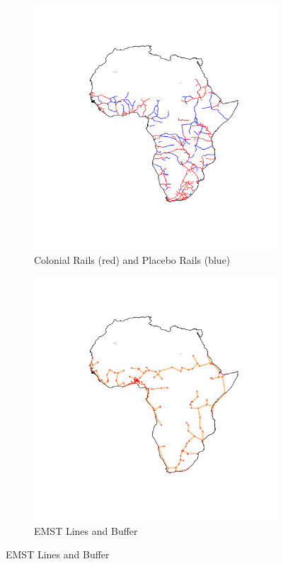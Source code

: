 \documentclass[11pt, oneside]{article}   	%
\begin{document}
\begin{figure}
\centering
\caption{Colonial Railway Network}

\begin{subfigure}[c]{0.48\textwidth}
\includegraphics[width=\textwidth,trim={10cm 11cm 6cm 10cm},clip]{../../Analysis/output/other_maps/all_rails.png}
\caption{Colonial Rails (red) and Placebo Rails (blue)}
\label{fig:Railroad_Map}
\end{subfigure}
\begin{subfigure}[c]{0.48\textwidth}
\includegraphics[width=\textwidth,trim={10cm 11cm 6cm 10cm},clip]{../../Analysis/output/other_maps/emst.png}
\caption{EMST Lines and Buffer}
\label{fig:EMST_Map}
\end{subfigure}


\end{figure}
\end{document}
